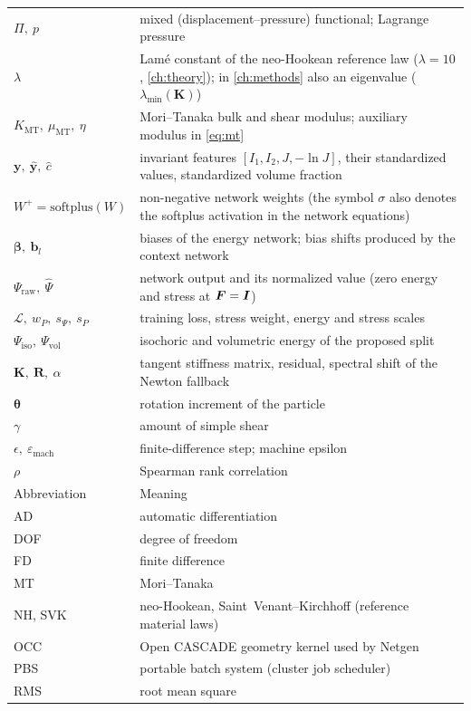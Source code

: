 \begin{longtable}{@{}p{}p{}@{}}
$\Pi,\ p$ & mixed (displacement--pressure) functional; Lagrange pressure\\
$\lambda$ & Lam\'e constant of the neo-Hookean reference law ($\lambda=10$, \cref{ch:theory}); in \cref{ch:methods} also an eigenvalue ($\lambda_{\min}(\bm K)$)\\
$K_{\mathrm{MT}},\ \mu_{\mathrm{MT}},\ \eta$ & Mori--Tanaka bulk and shear modulus; auxiliary modulus in \cref{eq:mt}\\
$\bm y,\ \hat{\bm y},\ \hat c$ & invariant features $[I_1,I_2,J,-\ln J]$, their standardized values, standardized volume fraction\\
$W^{+}=\mathrm{softplus}(W)$ & non-negative network weights (the symbol $\sigma$ also denotes the softplus activation in the network equations)\\
$\bm\beta,\ \bm b_l$ & biases of the energy network; bias shifts produced by the context network\\
$\Psi_{\mathrm{raw}},\ \widehat\Psi$ & network output and its normalized value (zero energy and stress at $\bm F=\bm I$)\\
$\mathcal L,\ w_P,\ s_\Psi,\ s_P$ & training loss, stress weight, energy and stress scales\\
$\Psi_{\mathrm{iso}},\ \Psi_{\mathrm{vol}}$ & isochoric and volumetric energy of the proposed split\\
$\bm K,\ \bm R,\ \alpha$ & tangent stiffness matrix, residual, spectral shift of the Newton fallback\\
$\bm\theta$ & rotation increment of the particle\\
$\gamma$ & amount of simple shear\\
$\epsilon,\ \varepsilon_{\mathrm{mach}}$ & finite-difference step; machine epsilon\\
$\rho$ & Spearman rank correlation\\
\midrule
Abbreviation & Meaning\\
\midrule
AD & automatic differentiation\\
DOF & degree of freedom\\
FD & finite difference\\
MT & Mori--Tanaka\\
NH, SVK & neo-Hookean, Saint~Venant--Kirchhoff (reference material laws)\\
OCC & Open CASCADE geometry kernel used by Netgen\\
PBS & portable batch system (cluster job scheduler)\\
RMS & root mean square\\

\end{longtable}
